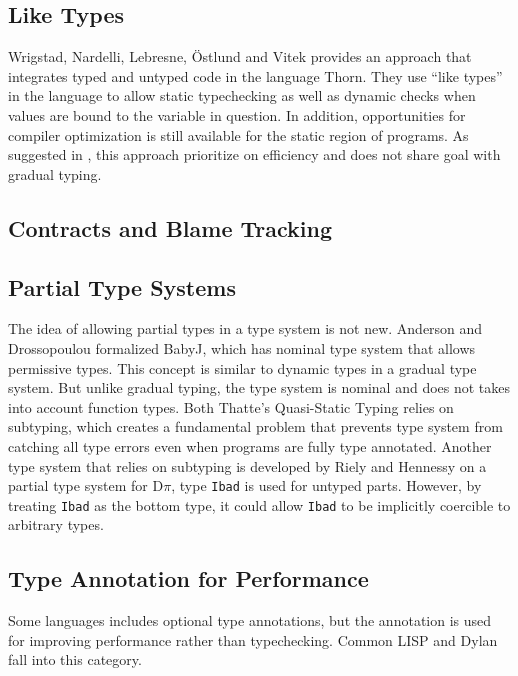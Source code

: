 \subsection{Like Types}

Wrigstad, Nardelli, Lebresne, {\"O}stlund and Vitek\cite{wrigstad2010integrating}
provides an approach that integrates typed and untyped code
in the language Thorn. They use ``like types'' in the language
to allow static typechecking as well as dynamic checks when
values are bound to the variable in question.
In addition, opportunities for compiler optimization
is still available for the static region of programs.
As suggested in \cite{siek2015refined}, this approach
prioritize on efficiency and does not share goal with gradual typing.

\subsection{Contracts and Blame Tracking}


\subsection{Partial Type Systems}
The idea of allowing partial types in a type system is not new.
Anderson and Drossopoulou formalized BabyJ\cite{anderson2003babyj}, which has
nominal type system that allows permissive types.
This concept is similar to dynamic types in a gradual type system.
But unlike gradual typing, the type system is nominal and does not takes into account function types.
Both Thatte's Quasi-Static Typing\cite{thatte1989quasi} relies on subtyping,
which creates a fundamental problem that prevents type system from catching all type errors even when programs are
fully type annotated.
Another type system that relies on subtyping
is developed by Riely and Hennessy\cite{riely1999trust} on a partial type system for D$\pi$,
type \texttt{Ibad} is used for untyped parts. However, by treating \texttt{Ibad} as the bottom type,
it could allow \texttt{Ibad} to be implicitly coercible to arbitrary types.

\subsection{Type Annotation for Performance}
Some languages includes optional type annotations, but
the annotation is used for improving performance rather than
typechecking.
Common LISP\cite{steele1982overview}
and Dylan\cite{feinberg1996dylan,shalit1996dylan} fall into this category.

